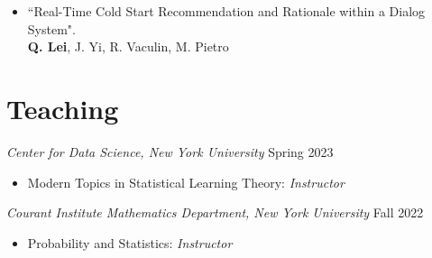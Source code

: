 \documentclass[margin, 10pt]{res} %
\begin{document}
\begin{resume}
\begin{itemize}
	\item{``Real-Time Cold Start Recommendation and Rationale within a Dialog System".\\
		\textbf{Q. Lei}, J. Yi, R. Vaculin, M. Pietro}
\end{itemize}
\begin{comment}
\section{SOFTWARE}
 \textit{Github: }\url{https://github.com/cecilialeiqi/}\\
 {\sl SPIRAL} \hfill May 2016 - July 2017
 \begin{itemize}
   \item Feature representation learning of any time series data
    \end{itemize}
 {\sl DDI} \hfill Jan 2017 - May 2017
 \begin{itemize}
   \item Use an inductive tensor completion based methods to predict drug-drug interactions
   \end{itemize}
   {\sl NUTF} \hfill August 2016 - February 2017
   \begin{itemize}
     \item Negative-Unlabeled Tensor Factorization for Location\ Context 
       Inference from Inaccurate Mobility Data
      \end{itemize}
 \end{itemize} 
\end{comment}

\section{Teaching}
{\sl Center for Data Science, New York University} \hfill Spring 2023
\begin{itemize}
	\item Modern Topics in Statistical Learning Theory:  {\sl Instructor}
\end{itemize}


{\sl Courant Institute Mathematics Department, New York University} \hfill Fall 2022
\begin{itemize}
	\item Probability and Statistics: {\sl Instructor}
\end{itemize}


\end{resume}
\end{document}
